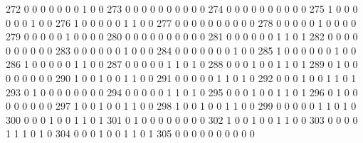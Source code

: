 \documentclass[compress,8pt]{beamer}
\begin{document}
\begin{frame}
\begin{Schunk}
  272      0       0   0              0        0    0       0       1   0   0
  273      0       0   0              0        0    0       0       0   0   0
  274      0       0   0              0        0    0       0       0   0   0
  275      1       0   0              0        0    0       0       1   0   0
  276      1       0   0              0        0    0       1       1   0   0
  277      0       0   0              0        0    0       0       0   0   0
  278      0       0   0              0        0    1       0       0   0   0
  279      0       0   0              0        0    1       0       0   0   0
  280      0       0   0              0        0    0       0       0   0   0
  281      0       0   0              0        0    0       1       1   0   1
  282      0       0   0              0        0    0       0       0   0   0
  283      0       0   0              0        0    0       1       0   0   0
  284      0       0   0              0        0    0       0       1   0   0
  285      1       0   0              0        0    0       0       1   0   0
  286      1       0   0              0        0    0       1       1   0   0
  287      0       0   0              0        0    1       1       0   1   0
  288      0       0   0              1        0    0       1       1   0   1
  289      0       1   0              0        0    0       0       0   0   0
  290      1       0   0              1        0    0       1       1   0   0
  291      0       0   0              0        0    1       1       0   1   0
  292      0       0   0              1        0    0       1       1   0   1
  293      0       1   0              0        0    0       0       0   0   0
  294      0       0   0              0        0    1       1       0   1   0
  295      0       0   0              1        0    0       1       1   0   1
  296      0       1   0              0        0    0       0       0   0   0
  297      1       0   0              1        0    0       1       1   0   0
  298      1       0   0              1        0    0       1       1   0   0
  299      0       0   0              0        0    1       1       0   1   0
  300      0       0   0              1        0    0       1       1   0   1
  301      0       1   0              0        0    0       0       0   0   0
  302      1       0   0              1        0    0       1       1   0   0
  303      0       0   0              0        1    1       1       0   1   0
  304      0       0   0              1        0    0       1       1   0   1
  305      0       0   0              0        0    0       0       0   0   0

\end{Schunk}
\end{frame}
\end{document}
